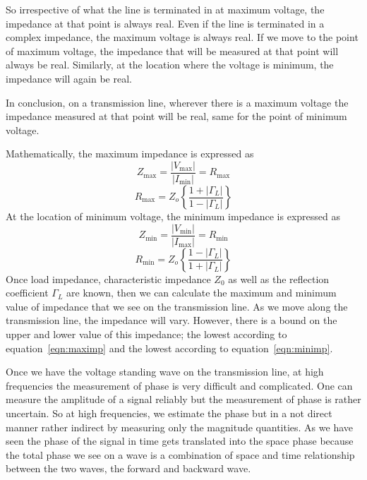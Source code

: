 So irrespective of what the line is terminated in at maximum voltage, the impedance at that point is always real. Even if the line is terminated in a complex impedance, the maximum voltage is always real. If we move to the point of maximum voltage, the impedance that will be measured at that point will always be real. Similarly, at the location where the voltage is minimum, the impedance will again be real.

In conclusion, on a transmission line, wherever there is a maximum voltage the impedance measured at that point will be real, same for the point of minimum voltage.

Mathematically, the maximum impedance is expressed as
\begin{equation}
Z_{\max} = \frac{|V_{\max}|}{|I_{\min}|} = R_{\max}
\label{eqn:maximp}
\end{equation}
\begin{equation}
R_{\max}= Z_o\left\{\frac{1+|\Gamma_L|}{1-|\Gamma_L|}\right\}
\end{equation}
At the location of minimum voltage, the minimum impedance is expressed as
\begin{equation}
Z_{\min}=\frac{|V_{\min}|}{|I_{\max}|} = R_{\min}
\label{eqn:minimp}
\end{equation}
\begin{equation}
R_{\min} =Z_o\left\{\frac{1-|\Gamma_L|}{1+|\Gamma_L|}\right\}
\end{equation}
Once load impedance, characteristic impedance $Z_0$ as well as the reflection coefficient $\Gamma_L$ are known, then we can calculate the maximum and minimum value of impedance that we see on the transmission line. As we move along the transmission line, the impedance will vary. However, there is a bound on the upper and lower value of this impedance; the lowest according to equation~\ref{eqn:maximp} and the lowest according to equation~\ref{eqn:minimp}.

Once we have the voltage standing wave on the transmission line, at high frequencies the measurement of phase is very difficult and complicated. One can measure the amplitude of a signal reliably but the measurement of phase is rather uncertain. So at high frequencies, we estimate the phase but in a not direct manner rather indirect by measuring only the magnitude quantities. As we have seen the phase of the signal in time gets translated into the space phase because the total phase we see on a wave is a combination of space and time relationship between the two waves, the forward and backward wave. 

